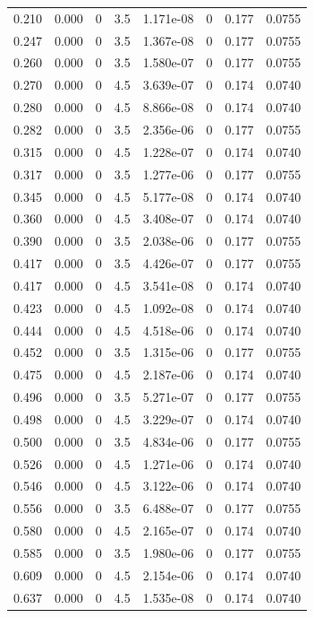 \documentclass[preview]{standalone}
\begin{document}
{{\begin{tabular}{L{1.2cm}C{1.2cm} C{0.3cm}C{0.5cm} C{1.4cm}C{1.4cm} C{1.4cm}C{1.4cm}}
  0.210  &  0.000  & 0     & 3.5 &  1.171e-08  & 0  & 0.177 &  0.0755   \\ 
  0.247  &  0.000  & 0     & 3.5 &  1.367e-08  & 0  & 0.177 &  0.0755   \\ 
  0.260  &  0.000  & 0     & 3.5 &  1.580e-07  & 0  & 0.177 &  0.0755   \\ 
  0.270  &  0.000  & 0     & 4.5 &  3.639e-07  & 0  & 0.174 &  0.0740   \\ 
  0.280  &  0.000  & 0     & 4.5 &  8.866e-08  & 0  & 0.174 &  0.0740   \\ 
  0.282  &  0.000  & 0     & 3.5 &  2.356e-06  & 0  & 0.177 &  0.0755   \\ 
  0.315  &  0.000  & 0     & 4.5 &  1.228e-07  & 0  & 0.174 &  0.0740   \\ 
  0.317  &  0.000  & 0     & 3.5 &  1.277e-06  & 0  & 0.177 &  0.0755   \\ 
  0.345  &  0.000  & 0     & 4.5 &  5.177e-08  & 0  & 0.174 &  0.0740   \\ 
  0.360  &  0.000  & 0     & 4.5 &  3.408e-07  & 0  & 0.174 &  0.0740   \\ 
  0.390  &  0.000  & 0     & 3.5 &  2.038e-06  & 0  & 0.177 &  0.0755   \\ 
  0.417  &  0.000  & 0     & 3.5 &  4.426e-07  & 0  & 0.177 &  0.0755   \\ 
  0.417  &  0.000  & 0     & 4.5 &  3.541e-08  & 0  & 0.174 &  0.0740   \\ 
  0.423  &  0.000  & 0     & 4.5 &  1.092e-08  & 0  & 0.174 &  0.0740   \\ 
  0.444  &  0.000  & 0     & 4.5 &  4.518e-06  & 0  & 0.174 &  0.0740   \\ 
  0.452  &  0.000  & 0     & 3.5 &  1.315e-06  & 0  & 0.177 &  0.0755   \\ 
  0.475  &  0.000  & 0     & 4.5 &  2.187e-06  & 0  & 0.174 &  0.0740   \\ 
  0.496  &  0.000  & 0     & 3.5 &  5.271e-07  & 0  & 0.177 &  0.0755   \\ 
  0.498  &  0.000  & 0     & 4.5 &  3.229e-07  & 0  & 0.174 &  0.0740   \\ 
  0.500  &  0.000  & 0     & 3.5 &  4.834e-06  & 0  & 0.177 &  0.0755   \\ 
  0.526  &  0.000  & 0     & 4.5 &  1.271e-06  & 0  & 0.174 &  0.0740   \\ 
  0.546  &  0.000  & 0     & 4.5 &  3.122e-06  & 0  & 0.174 &  0.0740   \\ 
  0.556  &  0.000  & 0     & 3.5 &  6.488e-07  & 0  & 0.177 &  0.0755   \\ 
  0.580  &  0.000  & 0     & 4.5 &  2.165e-07  & 0  & 0.174 &  0.0740   \\ 
  0.585  &  0.000  & 0     & 3.5 &  1.980e-06  & 0  & 0.177 &  0.0755   \\ 
  0.609  &  0.000  & 0     & 4.5 &  2.154e-06  & 0  & 0.174 &  0.0740   \\ 
  0.637  &  0.000  & 0     & 4.5 &  1.535e-08  & 0  & 0.174 &  0.0740   \\ 
\hline 
\end{tabular} 

}}
\end{document}
